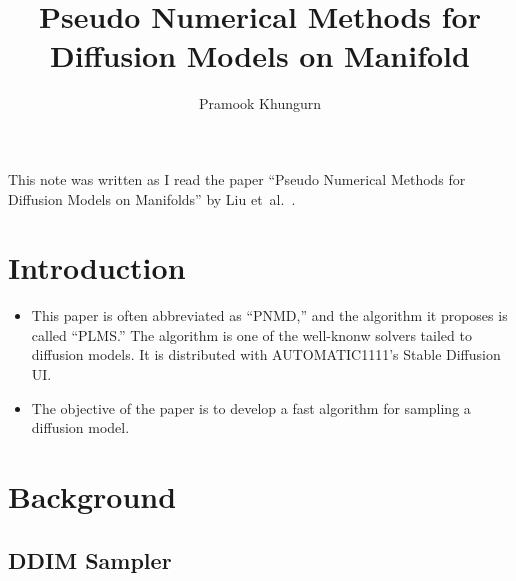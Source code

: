 \documentclass[10pt]{article}
\title{Pseudo Numerical Methods for Diffusion Models on Manifold}
\author{Pramook Khungurn}
\newcommand{\etal}{{et~al.}}
\begin{document}
\maketitle

This note was written as I read the paper ``Pseudo Numerical Methods for Diffusion Models on Manifolds'' by Liu \etal~\cite{Liu:2022}.

\section{Introduction}

\begin{itemize}
  \item This paper is often abbreviated as ``PNMD,'' and the algorithm it proposes is called ``PLMS.'' The algorithm is one of the well-knonw solvers tailed to diffusion models. It is distributed with AUTOMATIC1111's Stable Diffusion UI.
  
  \item The objective of the paper is to develop a fast algorithm for sampling a diffusion model.
\end{itemize}

\section{Background}

\subsection{DDIM Sampler}
\end{document}
